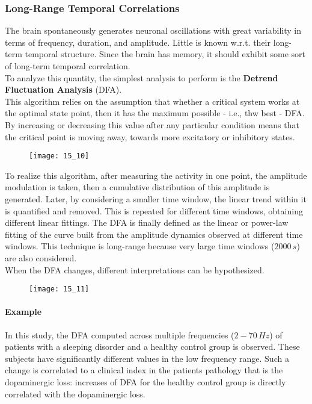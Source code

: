 \subsubsection{Long-Range Temporal Correlations}
The brain spontaneously generates neuronal oscillations with great variability in terms of frequency,
duration, and amplitude. Little is known w.r.t. their long-term temporal structure. Since the brain has
memory, it should exhibit some sort of long-term temporal correlation.\\
To analyze this quantity, the simplest analysis to perform is the \textbf{Detrend Fluctuation Analysis} (DFA).\\
This algorithm relies on the assumption that whether a critical system works at the optimal state point,
then it has the maximum possible - i.e., thw best - DFA. By increasing or decreasing this value after any particular
condition means that the critical point is moving away, towards more excitatory or inhibitory states.
\begin{figure}[H]
    \centering
    \texttt{[image: 15\_10]}
\end{figure}
To realize this algorithm, after measuring the activity in one point, the amplitude modulation is
taken, then a cumulative distribution of this amplitude is generated. Later, by considering a smaller
time window, the linear trend within it is quantified and removed. This is repeated for different time
windows, obtaining different linear fittings. The DFA is finally defined as the linear or power-law
fitting of the curve built from the amplitude dynamics observed at different time windows. This technique
is long-range because very large time windows (\(2000\,s\)) are also considered.\\
When the DFA changes, different interpretations can be hypothesized.
\begin{figure}[H]
    \centering
    \texttt{[image: 15\_11]}
\end{figure}
\paragraph{Example} In this study, the DFA computed across multiple frequencies (\(2-70\,Hz\)) of
patients with a sleeping disorder and a healthy control group is observed. These subjects have
significantly different values in the low frequency range. Such a change is correlated to a clinical
index in the patients pathology that is the dopaminergic loss: increases of DFA for the healthy control
group is directly correlated with the dopaminergic loss.
